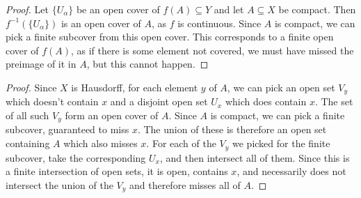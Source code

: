 \begin{proof}
	
	Let $\{U_\alpha\}$ be an open cover of $f(A)\subseteq Y$ and let $A\subseteq X$ be compact.  Then $f^{-1}(\{U_\alpha\})$ is an open cover of $A$, as $f$ is continuous.  Since $A$ is compact, we can pick a finite subcover from this open cover.  This corresponds to a finite open cover of $f(A)$, as if there is some element not covered, we must have missed the preimage of it in $A$, but this cannot happen.
	
	
	
	
\end{proof}



\begin{proof}
	
	Since $X$ is Hausdorff, for each element $y$ of $A$, we can pick an open set $V_y$ which doesn't contain $x$ and a disjoint open set $U_x$ which does contain $x$.  The set of all such $V_y$ form an open cover of $A$.  Since $A$ is compact, we can pick a finite subcover, guaranteed to miss $x$.  The union of these is therefore an open set containing $A$ which also misses $x$.  For each of the $V_y$ we picked for the finite subcover, take the corresponding $U_x$, and then intersect all of them.  Since this is a finite intersection of open sets, it is open, contains $x$, and necessarily does not intersect the union of the $V_y$ and therefore misses all of $A$.
	
\end{proof}


